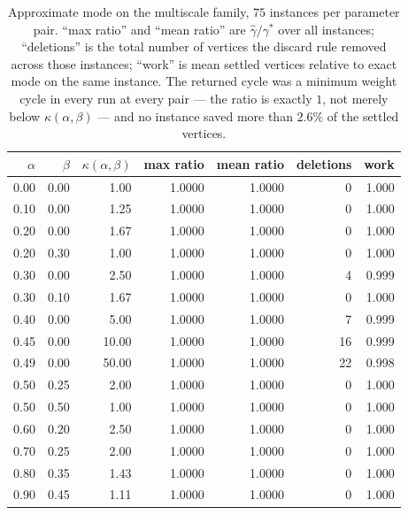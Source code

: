 
\begin{table}[ht]
\centering
\footnotesize
\setlength{\tabcolsep}{4pt}
\begin{tabular}{|r|r|r|r|r|r|r|}
\hline
$\alpha$ & $\beta$ & $\kappa(\alpha,\beta)$ & \textbf{max ratio} & \textbf{mean ratio} & \textbf{deletions} & \textbf{work} \\ \hline
0.00 & 0.00 & 1.00 & 1.0000 & 1.0000 & 0 & 1.000 \\ \hline
0.10 & 0.00 & 1.25 & 1.0000 & 1.0000 & 0 & 1.000 \\ \hline
0.20 & 0.00 & 1.67 & 1.0000 & 1.0000 & 0 & 1.000 \\ \hline
0.20 & 0.30 & 1.00 & 1.0000 & 1.0000 & 0 & 1.000 \\ \hline
0.30 & 0.00 & 2.50 & 1.0000 & 1.0000 & 4 & 0.999 \\ \hline
0.30 & 0.10 & 1.67 & 1.0000 & 1.0000 & 0 & 1.000 \\ \hline
0.40 & 0.00 & 5.00 & 1.0000 & 1.0000 & 7 & 0.999 \\ \hline
0.45 & 0.00 & 10.00 & 1.0000 & 1.0000 & 16 & 0.999 \\ \hline
0.49 & 0.00 & 50.00 & 1.0000 & 1.0000 & 22 & 0.998 \\ \hline
0.50 & 0.25 & 2.00 & 1.0000 & 1.0000 & 0 & 1.000 \\ \hline
0.50 & 0.50 & 1.00 & 1.0000 & 1.0000 & 0 & 1.000 \\ \hline
0.60 & 0.20 & 2.50 & 1.0000 & 1.0000 & 0 & 1.000 \\ \hline
0.70 & 0.25 & 2.00 & 1.0000 & 1.0000 & 0 & 1.000 \\ \hline
0.80 & 0.35 & 1.43 & 1.0000 & 1.0000 & 0 & 1.000 \\ \hline
0.90 & 0.45 & 1.11 & 1.0000 & 1.0000 & 0 & 1.000 \\ \hline
\end{tabular}
\caption{Approximate mode on the multiscale family, $75$ instances per
parameter pair. ``max ratio'' and ``mean ratio'' are $\widehat\gamma/\gamma^*$
over all instances; ``deletions'' is the total number of vertices the discard
rule removed across those instances; ``work'' is mean settled vertices relative
to exact mode on the same instance. The returned cycle was a minimum weight
cycle in every run at every pair --- the ratio is exactly $1$, not merely below $\kappa(\alpha,\beta)$ --- and no instance saved more than $2.6\%$ of the settled vertices.}
\label{tab:frontier}
\end{table}
